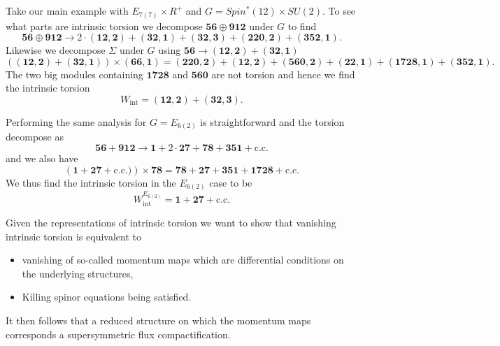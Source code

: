 Take our main example with $E_{7(7)}\times R^+$ and $G=Spin^*(12)\times SU(2)$. To see what parts are intrinsic torsion we decompose $\mathbf{56}\oplus\mathbf{912}$ under $G$ to find 
\begin{equation}
    \mathbf{56}\oplus\mathbf{912} \to 2\cdot (\mathbf{12},\mathbf{2})+(\mathbf{32},\mathbf{1})+(\mathbf{32},\mathbf{3})+(\mathbf{220},\mathbf{2})+(\mathbf{352},\mathbf{1}).
\end{equation}
Likewise we decompose $\Sigma$ under $G$ using $\mathbf{56}\to (\mathbf{12},\mathbf{2})+(\mathbf{32},\mathbf{1})$ 
\begin{equation}
    \left((\mathbf{12},\mathbf{2})+(\mathbf{32},\mathbf{1})\right)\times (\mathbf{66},\mathbf{1})=(\mathbf{220},\mathbf{2})+(\mathbf{12},\mathbf{2})+(\mathbf{560},\mathbf{2})+(\mathbf{22},\mathbf{1})+(\mathbf{1728},\mathbf{1})+(\mathbf{352},\mathbf{1}).
\end{equation}
The two big modules containing $\mathbf{1728}$ and $\mathbf{560}$ are not torsion and hence we find the intrinsic torsion 
\begin{equation}
    W_{\text{int}} = (\mathbf{12},\mathbf{2})+(\mathbf{32},\mathbf{3}).
\end{equation}

Performing the same analysis for $G=E_{6(2)}$ is straightforward and the torsion decompose as
\begin{equation}
    \mathbf{56}+\mathbf{912}\to \mathbf{1}+2\cdot\mathbf{27}+\mathbf{78}+\mathbf{351}+\text{c.c.}
\end{equation}
and we also have 
\begin{equation}
    \left(\mathbf{1}+\mathbf{27}+\text{c.c.})\right)\times \mathbf{78} = \mathbf{78}+\mathbf{27}+\mathbf{351}+\mathbf{1728}+\text{c.c.}
\end{equation}
We thus find the intrinsic torsion in the $E_{6(2)}$ case to be 
\begin{equation}
    W_{\text{int}}^{E_{6(2)}} = \textbf{1}+\mathbf{27}+\text{c.c.}
\end{equation}

Given the representations of intrinsic torsion we want to show that vanishing intrinsic torsion is equivalent to
\begin{itemize}
    \item vanishing of so-called momentum maps which are differential conditions on the underlying structures,
    \item Killing spinor equations being satisfied. 
\end{itemize}
It then follows that a reduced structure on which the momentum maps corresponds a supersymmetric flux compactification. 


